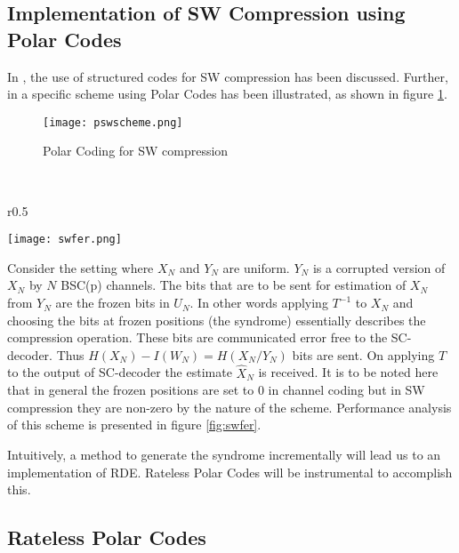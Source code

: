 \documentclass[
11pt, %
a4paper, %
oneside, %
headinclude,footinclude, %
BCOR5mm, %
]{scrartcl}
\begin{document}
\subsection{Implementation of SW Compression using Polar Codes}\label{psw}
In \cite{discus}, the use of structured codes for SW compression has been discussed. Further, in \cite{pslep} a specific scheme using Polar Codes has been illustrated, as shown in figure \ref{fig:pswscheme}.
\begin{figure}[h!]
 \begin{center}
    \texttt{[image: pswscheme.png]}
  \end{center}
  \caption{Polar Coding for SW compression}
  \label{fig:pswscheme}
\end{figure}\\
\begin{wrapfigure}{r}{0.5\textwidth}
 \begin{center}
    \texttt{[image: swfer.png]}
  \end{center}
  \caption{FER vs Rate for SW compression with Polar Code}
  \label{fig:swfer}
\end{wrapfigure}
Consider the setting where $X_N$ and $Y_N$ are uniform. $Y_N$ is a corrupted version of $X_N$ by $N$ BSC(p) channels. The bits that are to be sent for estimation of $X_N$ from $Y_N$ are the frozen bits in $U_N$. In other words applying $T^{-1}$ to $X_N$ and choosing the bits at frozen positions (the syndrome) essentially describes the compression operation. These bits are communicated error free to the SC-decoder. Thus $H(X_N)-I(W_N)=H(X_N/Y_N)$ bits are sent. On applying $T$ to the output of SC-decoder the estimate $\hat{X}_N$ is received. It is to be noted here that in general the frozen positions are set to $0$ in channel coding but in SW compression they are non-zero by the nature of the scheme. Performance analysis of this scheme is presented in figure \ref{fig:swfer}.

Intuitively, a method to generate the syndrome incrementally will lead us to an implementation of RDE. Rateless Polar Codes will be instrumental to accomplish this.
\clearpage
\subsection{Rateless Polar Codes}
\end{document}
